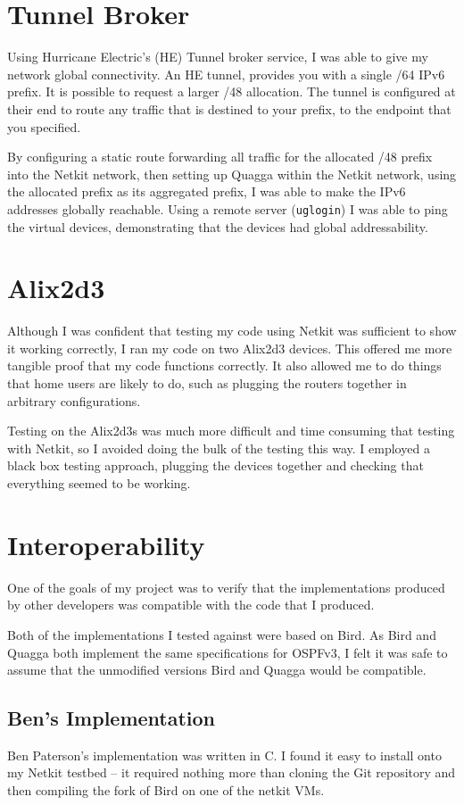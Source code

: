 \documentclass[12pt,a4paper,twoside]{report}
\begin{document}
\section{Tunnel Broker}
Using Hurricane Electric's (HE) Tunnel broker service, I was able to give my
network global connectivity. An HE tunnel,
provides you with a single /64 IPv6 prefix. It is possible to request a larger
/48 allocation. The tunnel is configured at their end to route any traffic
that is destined to your prefix, to the endpoint that you specified.  

By configuring a static route forwarding all traffic for the allocated /48
prefix into the Netkit network, then setting up Quagga within the Netkit
network, using the allocated prefix as its aggregated prefix, I was able to
make the IPv6 addresses globally reachable. Using a remote server
(\texttt{uglogin}) I was able to ping the virtual devices, demonstrating that
the devices had global addressability.

\section{Alix2d3}
Although I was confident that testing my code using Netkit was
sufficient to show it working correctly, I ran my code on two Alix2d3 devices.
This offered me more tangible proof that my code functions correctly. It also
allowed me to do things that home users are likely to do, such as plugging the
routers together in arbitrary configurations.

Testing on the Alix2d3s was much more difficult and time consuming that testing
with Netkit, so I avoided doing the bulk of the testing this way. I employed a
black box testing approach, plugging the devices together and checking that
everything seemed to be working. 

\section{Interoperability}
One of the goals of my project was to verify that the implementations produced
by other developers was compatible with the code that I produced. 

Both of the implementations I tested against were based on Bird. As Bird and
Quagga both implement the same specifications for OSPFv3, I felt it was safe to
assume that the unmodified versions Bird and Quagga would be compatible. 

\subsection{Ben's Implementation}
Ben Paterson's implementation was written in C. I found it easy to install onto
my Netkit testbed -- it required nothing more than cloning the Git repository
and then compiling the fork of Bird on one of the netkit VMs. 
\end{document}
